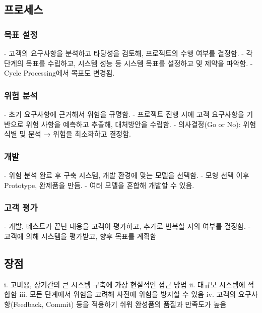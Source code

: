 \documentclass[a4paper,12pt]{article}
\begin{document}
\subsection{프로세스}

\subsubsection{목표 설정}
- 고객의 요구사항을 분석하고 타당성을 검토해, 프로젝트의 수행 여부를 결정함.
\newline
- 각 단계의 목표를 수립하고, 시스템 성능 등 시스템 목표를 설정하고 및 제약을 파악함.
\newline
- Cycle Processing에서 목표도 변경됨.

\subsubsection{위험 분석}
- 초기 요구사항에 근거해서 위험을 규명함.
\newline
- 프로젝트 진행 시에 고객 요구사항을 기반으로 위험 사항을 예측하고 추출해, 대처방안을 수립함.
\newline
- 의사결정(Go or No): 위험 식별 및 분석 → 위험을 최소화하고 결정함.

\subsubsection{개발}
- 위험 분석 완료 후 구축 시스템, 개발 환경에 맞는 모델을 선택함.
\newline
- 모형 선택 이후 Prototype, 완제품을 만듬.
\newline
- 여러 모델을 혼합해 개발할 수 있음.

\subsubsection{고객 평가}
- 개발, 테스트가 끝난 내용을 고객이 평가하고, 추가로 반복할 지의 여부를 결정함.
\newline
- 고객에 의해 시스템을 평가받고, 향후 목표를 계획함
\newline

\subsection{장점}
i. 고비용, 장기간의 큰 시스템 구축에 가장 현실적인 접근 방법
\newline
ii. 대규모 시스템에 적합함
\newline
iii. 모든 단계에서 위험을 고려해 사전에 위험을 방지할 수 있음
\newline
iv. 고객의 요구사항(Feedback, Commit) 등을 적용하기 쉬워 완성품의 품질과 만족도가 높음
\newline
\end{document}
